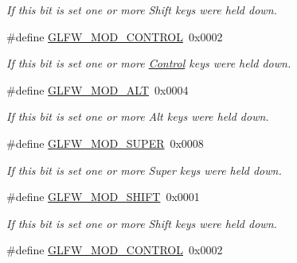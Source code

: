 \begin{DoxyCompactItemize}
\begin{DoxyCompactList}\small\item\em If this bit is set one or more Shift keys were held down. \end{DoxyCompactList}\item 
\mbox{\label{group__mods_ga6ed94871c3208eefd85713fa929d45aa}} 
\#define \hyperlink{group__mods_ga6ed94871c3208eefd85713fa929d45aa}{G\+L\+F\+W\+\_\+\+M\+O\+D\+\_\+\+C\+O\+N\+T\+R\+OL}~0x0002
\begin{DoxyCompactList}\small\item\em If this bit is set one or more \hyperlink{classControl}{Control} keys were held down. \end{DoxyCompactList}\item 
\mbox{\label{group__mods_gad2acd5633463c29e07008687ea73c0f4}} 
\#define \hyperlink{group__mods_gad2acd5633463c29e07008687ea73c0f4}{G\+L\+F\+W\+\_\+\+M\+O\+D\+\_\+\+A\+LT}~0x0004
\begin{DoxyCompactList}\small\item\em If this bit is set one or more Alt keys were held down. \end{DoxyCompactList}\item 
\mbox{\label{group__mods_ga6b64ba10ea0227cf6f42efd0a220aba1}} 
\#define \hyperlink{group__mods_ga6b64ba10ea0227cf6f42efd0a220aba1}{G\+L\+F\+W\+\_\+\+M\+O\+D\+\_\+\+S\+U\+P\+ER}~0x0008
\begin{DoxyCompactList}\small\item\em If this bit is set one or more Super keys were held down. \end{DoxyCompactList}\item 
\mbox{\label{group__mods_ga14994d3196c290aaa347248e51740274}} 
\#define \hyperlink{group__mods_ga14994d3196c290aaa347248e51740274}{G\+L\+F\+W\+\_\+\+M\+O\+D\+\_\+\+S\+H\+I\+FT}~0x0001
\begin{DoxyCompactList}\small\item\em If this bit is set one or more Shift keys were held down. \end{DoxyCompactList}\item 
\mbox{\label{group__mods_ga6ed94871c3208eefd85713fa929d45aa}} 
\#define \hyperlink{group__mods_ga6ed94871c3208eefd85713fa929d45aa}{G\+L\+F\+W\+\_\+\+M\+O\+D\+\_\+\+C\+O\+N\+T\+R\+OL}~0x0002

\end{DoxyCompactItemize}
